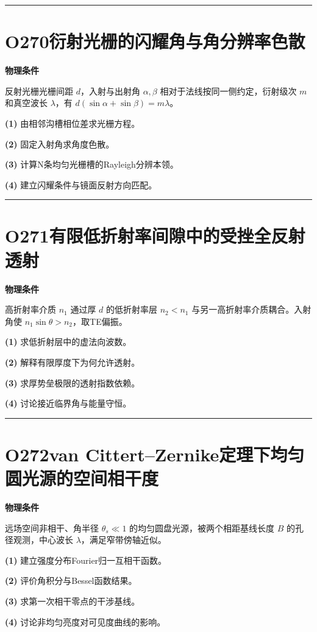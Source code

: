 \documentclass[UTF8,a4paper,11pt,oneside,openany]{ctexbook}
\begin{document}
\par\bigskip\hrule\bigskip
\section*{O270\quad 衍射光栅的闪耀角与角分辨率色散}
\textbf{物理条件}\par 反射光栅光栅间距 \(d\)，入射与出射角 \(\alpha,\beta\) 相对于法线按同一侧约定，衍射级次 \(m\) 和真空波长 \(\lambda\)，有 \(d(\sin\alpha+\sin\beta)=m\lambda\)。
\par\noindent\textbf{(1)} 由相邻沟槽相位差求光栅方程。
\par\noindent\textbf{(2)} 固定入射角求角度色散。
\par\noindent\textbf{(3)} 计算N条均匀光栅槽的Rayleigh分辨本领。
\par\noindent\textbf{(4)} 建立闪耀条件与镜面反射方向匹配。

\par\bigskip\hrule\bigskip
\section*{O271\quad 有限低折射率间隙中的受挫全反射透射}
\textbf{物理条件}\par 高折射率介质 \(n_1\) 通过厚 \(d\) 的低折射率层 \(n_2<n_1\) 与另一高折射率介质耦合。入射角使 \(n_1\sin\theta>n_2\)，取TE偏振。
\par\noindent\textbf{(1)} 求低折射层中的虚法向波数。
\par\noindent\textbf{(2)} 解释有限厚度下为何允许透射。
\par\noindent\textbf{(3)} 求厚势垒极限的透射指数依赖。
\par\noindent\textbf{(4)} 讨论接近临界角与能量守恒。

\par\bigskip\hrule\bigskip
\section*{O272\quad van Cittert–Zernike定理下均匀圆光源的空间相干度}
\textbf{物理条件}\par 远场空间非相干、角半径 \(\theta_s\ll1\) 的均匀圆盘光源，被两个相距基线长度 \(B\) 的孔径观测，中心波长 \(\lambda\)，满足窄带傍轴近似。
\par\noindent\textbf{(1)} 建立强度分布Fourier归一互相干函数。
\par\noindent\textbf{(2)} 评价角积分与Bessel函数结果。
\par\noindent\textbf{(3)} 求第一次相干零点的干涉基线。
\par\noindent\textbf{(4)} 讨论非均匀亮度对可见度曲线的影响。
\end{document}
